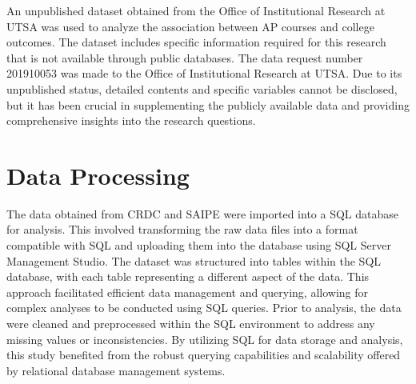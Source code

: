 \documentclass[sn-mathphys-num]{sn-jnl}%
\theoremstyle{thmstyleone}%
\theoremstyle{thmstyletwo}%
\theoremstyle{thmstylethree}%
\begin{document}
An unpublished dataset obtained from the Office of Institutional Research at UTSA was used to analyze the association between AP courses and college outcomes. The dataset includes specific information required for this research that is not available through public databases. The data request number 201910053 was made to the Office of Institutional Research at UTSA. Due to its unpublished status, detailed contents and specific variables cannot be disclosed, but it has been crucial in supplementing the publicly available data and providing comprehensive insights into the research questions.\\



\section{Data Processing}
The data obtained from CRDC and SAIPE were imported into a SQL database for analysis. This involved transforming the raw data files into a format compatible with SQL and uploading them into the database using SQL Server Management Studio. The dataset was structured into tables within the SQL database, with each table representing a different aspect of the data. This approach facilitated efficient data management and querying, allowing for complex analyses to be conducted using SQL queries. Prior to analysis, the data were cleaned and preprocessed within the SQL environment to address any missing values or inconsistencies. By utilizing SQL for data storage and analysis, this study benefited from the robust querying capabilities and scalability offered by relational database management systems.\\
\end{document}
